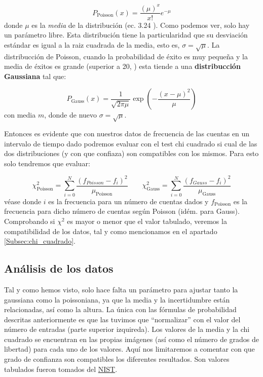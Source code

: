 \documentclass[11pt]{article}
\newcommand{\parentesis}[1]{\left( #1  \right)}
\begin{document}
\begin{equation}
	P_{\text{Poisson}}(x) = \frac{(\mu)^x}{x!} e^{-\mu}
\end{equation}
donde $\mu$ es la \textit{media} de la distribución (ec. 3.24 \cite{Knoll:1300754}). Como podemos ver, solo hay un parámetro libre. Esta distribución tiene la particularidad que su desviación estándar es igual a la raiz cuadrada de la media, esto es, $\sigma = \sqrt{\mu}$. La distribucción de Poisson, cuando la probabilidad de éxito es muy pequeña y la media de éxitos es grande (superior a 20, \cite{Knoll:1300754}) esta tiende a una \textbf{distribucción Gaussiana} tal que: 

\begin{equation}
	P_{\text{Gauss}} (x) = \frac{1}{\sqrt{2\pi \mu}} \exp \parentesis{- \frac{(x-\mu)^2}{\mu}}
\end{equation}
con media $m$, donde de nuevo $\sigma=\sqrt{\mu}$.

Entonces es evidente que con nuestros datos de frecuencia de las cuentas en un intervalo de tiempo dado podremos evaluar con el test chi cuadrado si cual de las dos distribuciones (y con que confiaza) son compatibles con los mismos. Para esto solo tendremos que evaluar: 

\begin{equation}
	\chi^2_{\text{Poisson}} = \sum_{i=0}^N \frac{(f_{Poisson}-f_i)^2}{\mu_{\text{Poisson}}} \qquad 
	\chi^2_{\text{Gauss}} = \sum_{i=0}^N \frac{(f_{Gauss}-f_i)^2}{\mu_{\text{Gauss}}}
\end{equation}
véase \cite{Bevington:1305448} donde $i$ es la frecuencia para un número de cuentas dados y $f_{\text{Poisson}}$ es la frecuencia para dicho número de cuentas según Poisson (idém. para Gauss). Comprobando si $\chi^2$ es mayor o menor que el valor tabulado, veremos la compatibilidad de los datos, tal y como mencionamos en el apartado \ref{Subsec:chi_cuadrado}.

\subsection{Análisis de los datos}

Tal y como hemos visto, solo hace falta un parámetro para ajustar tanto la gaussiana como la poissoniana, ya que la media y la incertidumbre están relacionadas, así como la altura. La única con las fórmulas de probabilidad descritas anteriormente es que las tuvimos que ``normalizar'' con el valor del número de entradas (parte superior izquireda). Los valores de la media y la chi cuadrado se encuentran en las propias imágenes (así como el número de grados de libertad) para cada uno de los valores. Aquí nos limitaremos a comentar con que grado de confianza son compatibles los diferentes resultados. Son valores tabulados fueron tomados del \href{https://www.itl.nist.gov/div898/handbook/eda/section3/eda3674.htm}{NIST}. 
\end{document}
